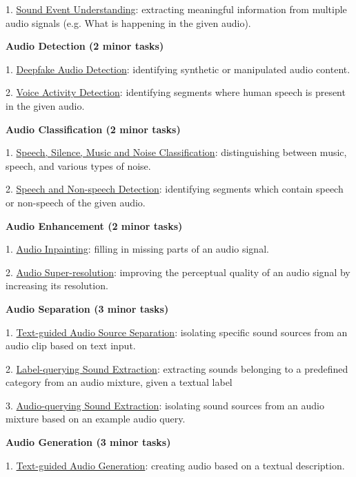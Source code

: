 
1. \underline{Sound Event Understanding}: extracting meaningful information from multiple audio signals (e.g. What is happening in the given audio). 




\textbf{Audio Detection (2 minor tasks)}

1. \underline{Deepfake Audio Detection}: identifying synthetic or manipulated audio content.


2. \underline{Voice Activity Detection}: identifying segments where human speech is present in the given audio.

\textbf{Audio Classification (2 minor tasks)}

1. \underline{Speech, Silence, Music and Noise Classification}: distinguishing between music, speech, and various types of noise.

2. \underline{Speech and Non-speech Detection}: identifying segments which contain speech or non-speech of the given audio.


\textbf{Audio Enhancement (2 minor tasks)}	

1. \underline{Audio Inpainting}: filling in missing parts of an audio signal.

2. \underline{Audio Super-resolution}: improving the perceptual quality of an audio signal by increasing its resolution.


\textbf{Audio Separation (3 minor tasks)}

1. \underline{Text-guided Audio Source Separation}: isolating specific sound sources from an audio clip based on text input.

2. \underline{Label-querying Sound Extraction}: extracting sounds belonging to a predefined category from an audio mixture, given a textual label 

3. \underline{Audio-querying Sound Extraction}: isolating sound sources from an audio mixture based on an example audio query.


\textbf{Audio Generation (3 minor tasks)}	

1. \underline{Text-guided Audio Generation}: creating audio based on a textual description.

